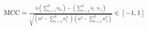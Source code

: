 \usepackage{amsmath}



    $
    \textrm{MCC} =
        \frac{
            n\left(\sum_{i=1}^{k}n_{ii}\right) -
            \left(\sum_{i=1}^{k}n_{i\cdot}n_{\cdot{}i}\right)
        }{
            \sqrt{
                \left(n^2-\sum_{i=1}^{k}n_{i\cdot}^2\right)
                \left(n^2-\sum_{i=1}^{k}n_{\cdot{}i}^2\right)
            }
        }
        \in{} [-1, 1]
    $

